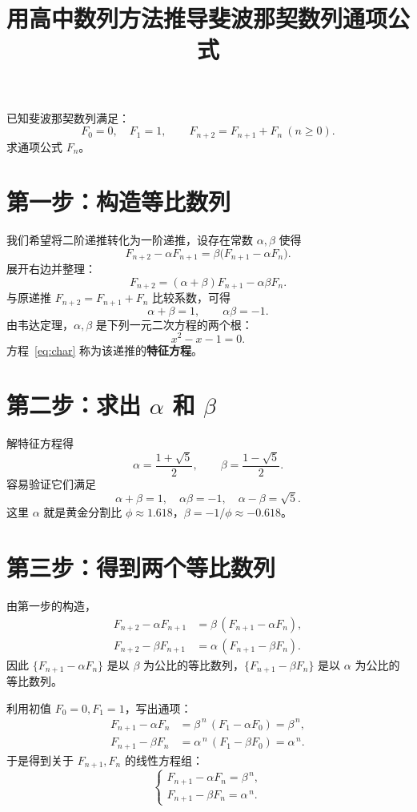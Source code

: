 \documentclass[12pt,a4paper]{ctexart}
\begin{document}
\title{用高中数列方法推导斐波那契数列通项公式}
\author{}
\date{}
\maketitle

\noindent
已知斐波那契数列满足：
\[
F_0=0,\quad F_1=1,\qquad F_{n+2}=F_{n+1}+F_n\ (n\geq 0).
\]
求通项公式 $F_n$。

\section*{第一步：构造等比数列}
我们希望将二阶递推转化为一阶递推，设存在常数 $\alpha,\beta$ 使得
\[
F_{n+2}-\alpha F_{n+1}=\beta\big(F_{n+1}-\alpha F_n\big).
\]
展开右边并整理：
\[
F_{n+2}=(\alpha+\beta)F_{n+1}-\alpha\beta F_n.
\]
与原递推 $F_{n+2}=F_{n+1}+F_n$ 比较系数，可得
\[
\alpha+\beta=1,\qquad \alpha\beta=-1.
\]
由韦达定理，$\alpha,\beta$ 是下列一元二次方程的两个根：
\begin{equation}\label{eq:char}
x^2-x-1=0.
\end{equation}
方程~\eqref{eq:char} 称为该递推的\textbf{特征方程}。

\section*{第二步：求出 $\alpha$ 和 $\beta$}
解特征方程得
\[
\alpha=\frac{1+\sqrt5}{2},\qquad \beta=\frac{1-\sqrt5}{2}.
\]
容易验证它们满足
\[
\alpha+\beta=1,\quad \alpha\beta=-1,\quad \alpha-\beta=\sqrt5.
\]
这里 $\alpha$ 就是黄金分割比 $\phi\approx1.618$，$\beta=-1/\phi\approx-0.618$。

\section*{第三步：得到两个等比数列}
由第一步的构造，
\begin{align*}
F_{n+2}-\alpha F_{n+1} &= \beta\,(F_{n+1}-\alpha F_n),\\
F_{n+2}-\beta F_{n+1} &= \alpha\,(F_{n+1}-\beta F_n).
\end{align*}
因此 $\{F_{n+1}-\alpha F_n\}$ 是以 $\beta$ 为公比的等比数列，$\{F_{n+1}-\beta F_n\}$ 是以 $\alpha$ 为公比的等比数列。

利用初值 $F_0=0,F_1=1$，写出通项：
\begin{align*}
F_{n+1}-\alpha F_n &= \beta^{\,n}\,(F_1-\alpha F_0)=\beta^{\,n},\\
F_{n+1}-\beta F_n &= \alpha^{\,n}\,(F_1-\beta F_0)=\alpha^{\,n}.
\end{align*}
于是得到关于 $F_{n+1},F_n$ 的线性方程组：
\begin{equation}\label{eq:sys}
\begin{cases}
F_{n+1}-\alpha F_n = \beta^{\,n},\\[4pt]
F_{n+1}-\beta F_n = \alpha^{\,n}.
\end{cases}
\end{equation}
\end{document}
